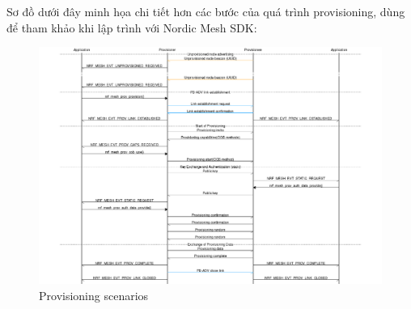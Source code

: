 	\newpage
            Sơ đồ dưới đây minh họa chi tiết hơn các bước của quá trình provisioning, dùng để tham khảo khi lập trình với Nordic Mesh SDK:
            \begin{figure}[h!]
            	\begin{center}
            		\includegraphics[scale=0.5]{images/provisioning.png}
            		\caption{Provisioning scenarios}
            	\end{center}
            \end{figure}

